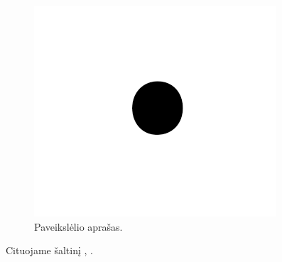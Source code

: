\documentclass[conference]{IEEEtran}
\begin{document}
\begin{figure}[ht] %
\centerline{\includegraphics{fig1.png}}
\caption{Paveikslėlio aprašas.}
\label{fig}
\end{figure}

Cituojame šaltinį \cite{lecun2015deep}, \cite{desai2021redcaps}.

%
%
\printbibliography[heading=bibintoc]
\end{document}
